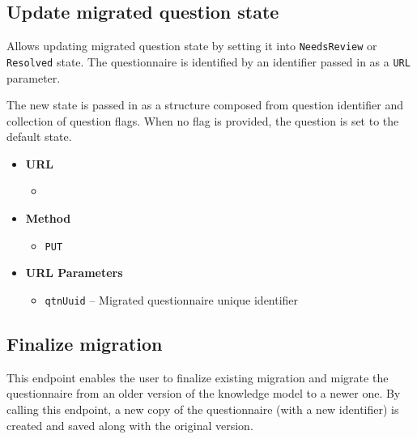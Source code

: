 \subsection{Update migrated question state}

Allows updating migrated question state by setting it into \texttt{NeedsReview} or \texttt{Resolved} state.
The questionnaire is identified by an identifier passed in as a \texttt{URL} parameter.

The new state is passed in as a structure composed from question identifier and collection of question flags.
When no flag is provided, the question is set to the default state.

\begin{itemize}
    \item \textbf{URL}
        \begin{itemize}
            \item {}
        \end{itemize}

    \item \textbf{Method}
        \begin{itemize}
            \item \texttt{PUT}
        \end{itemize}

    \item \textbf{URL Parameters}
        \begin{itemize}
            \item \texttt{qtnUuid} -- Migrated questionnaire unique identifier
        \end{itemize}
\end{itemize}

\subsection{Finalize migration}

This endpoint enables the user to finalize existing migration and migrate the questionnaire from an older version of the knowledge model to a newer one.
By calling this endpoint, a new copy of the questionnaire (with a new identifier) is created and saved along with the original version.

